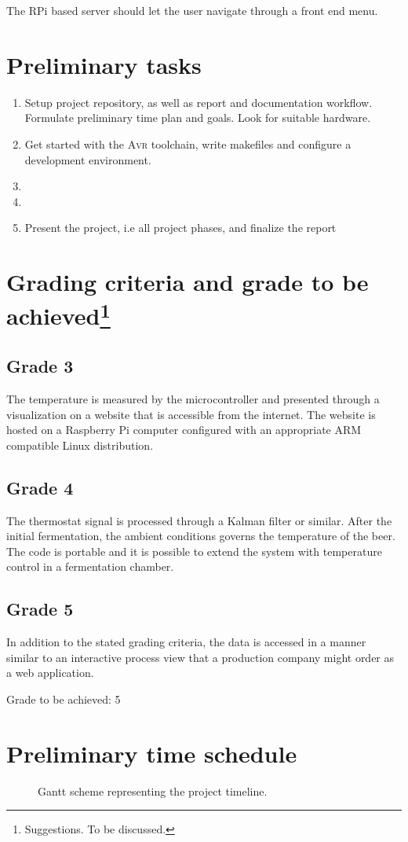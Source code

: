 \documentclass[10pt]{article}
\newcommand{\AVR}{\textsc{Avr}\xspace}
\begin{document}
The RPi based server should let the user navigate through a front end menu.
\section*{Preliminary tasks}%
\label{sec:preliminary_tasks}
\begin{enumerate}
  \item
Setup project repository, as well as report and documentation workflow. Formulate preliminary time plan and goals. Look for suitable hardware.
  \item
Get started with the \AVR toolchain, write makefiles and configure a development environment.
  \item
  \item
  \item Present the project, i.e all project phases, and finalize the report
\end{enumerate}
\section*{Grading criteria and grade to be achieved\protect\footnote{Suggestions. To be discussed.}}%
\label{sec:grading_criteria_and_grading_goal}
\subsection*{Grade 3}%
\label{sub:grade_3}
The temperature is measured by the microcontroller and presented through a visualization on a website that is accessible from the internet. The website is hosted on a Raspberry Pi computer configured with an appropriate ARM compatible Linux distribution.
\subsection*{Grade 4}%
\label{sub:grade_4}
The thermostat signal is processed through a Kalman filter or similar. After the initial fermentation, the ambient conditions governs the temperature of the beer. The code is portable and it is possible to extend the system with temperature control in a fermentation chamber.
\subsection*{Grade 5}%
\label{sub:grade_5}
In addition to the stated grading criteria, the data is accessed in a manner similar to an interactive process view that a production company might order as a web application.

Grade to be achieved: 5
\section*{Preliminary time schedule}%
\label{sec:preliminary_time_schedule}


\begin{figure}[ht]
  \centering
  
  \caption{Gantt scheme representing the project timeline.}
  \label{fig:}
\end{figure}
\end{document}
